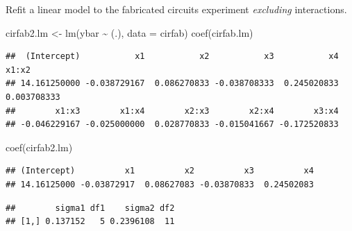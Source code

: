 \documentclass[
  ignorenonframetext,
]{beamer}
\newenvironment{Shaded}{\begin{snugshade}}{\end{snugshade}}
\newcommand{\AttributeTok}[1]{\textcolor[rgb]{0.77,0.63,0.00}{#1}}
\newcommand{\DecValTok}[1]{\textcolor[rgb]{0.00,0.00,0.81}{#1}}
\newcommand{\FunctionTok}[1]{\textcolor[rgb]{0.00,0.00,0.00}{#1}}
\newcommand{\NormalTok}[1]{#1}
\newcommand{\OtherTok}[1]{\textcolor[rgb]{0.56,0.35,0.01}{#1}}
\newcommand{\SpecialCharTok}[1]{\textcolor[rgb]{0.00,0.00,0.00}{#1}}
\begin{document}
\begin{frame}[fragile]{}
\protect\hypertarget{section-9}{}
Refit a linear model to the fabricated circuits experiment
\emph{excluding} interactions.

\begin{Shaded}
\begin{Highlighting}[]
\NormalTok{cirfab2.lm }\OtherTok{\textless{}{-}} \FunctionTok{lm}\NormalTok{(ybar }\SpecialCharTok{\textasciitilde{}}\NormalTok{ (.), }\AttributeTok{data =}\NormalTok{ cirfab)}
\FunctionTok{coef}\NormalTok{(cirfab.lm)}
\end{Highlighting}
\end{Shaded}

\begin{verbatim}
##  (Intercept)           x1           x2           x3           x4        x1:x2 
## 14.161250000 -0.038729167  0.086270833 -0.038708333  0.245020833  0.003708333 
##        x1:x3        x1:x4        x2:x3        x2:x4        x3:x4 
## -0.046229167 -0.025000000  0.028770833 -0.015041667 -0.172520833
\end{verbatim}

\begin{Shaded}
\begin{Highlighting}[]
\FunctionTok{coef}\NormalTok{(cirfab2.lm)}
\end{Highlighting}
\end{Shaded}

\begin{verbatim}
## (Intercept)          x1          x2          x3          x4 
## 14.16125000 -0.03872917  0.08627083 -0.03870833  0.24502083
\end{verbatim}

\begin{Shaded}
\end{Shaded}

\begin{verbatim}
##        sigma1 df1    sigma2 df2
## [1,] 0.137152   5 0.2396108  11
\end{verbatim}
\end{frame}
\end{document}
